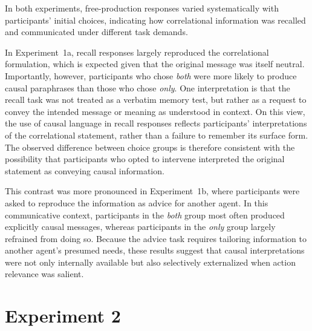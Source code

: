 \documentclass[10pt,letterpaper]{article}
\newcommand{\DL}[1]{\textcolor{red}{[DL: #1]}}
\begin{document}
In both experiments, free-production responses varied systematically with participants’ initial choices, indicating how correlational information was recalled and communicated under different task demands.

In Experiment~1a, recall responses largely reproduced the correlational formulation, which is expected given that the original message was itself neutral. Importantly, however, participants who chose \emph{both} were more likely to produce causal paraphrases than those who chose \emph{only}. One interpretation is that the recall task was not treated as a verbatim memory test, but rather as a request to convey the intended message or meaning as understood in context. On this view, the use of causal language in recall responses reflects participants’ interpretations of the correlational statement, rather than a failure to remember its surface form. The observed difference between choice groups is therefore consistent with the possibility that participants who opted to intervene interpreted the original statement as conveying causal information.

This contrast was more pronounced in Experiment~1b, where participants were asked to reproduce the information as advice for another agent. In this communicative context, participants in the \emph{both} group most often produced explicitly causal messages, whereas participants in the \emph{only} group largely refrained from doing so. Because the advice task requires tailoring information to another agent’s presumed needs, these results suggest that causal interpretations were not only internally available but also selectively externalized when action relevance was salient.


\section{Experiment 2}
\end{document}
